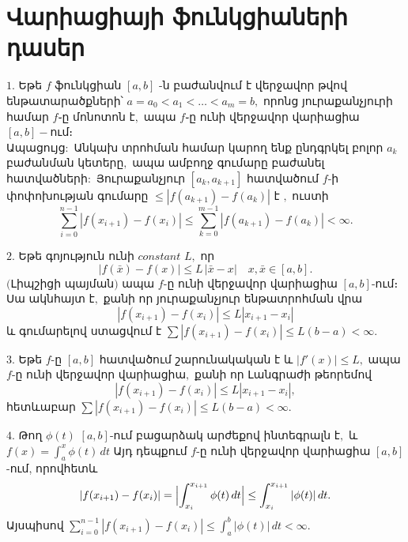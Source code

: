 \documentclass[12pt]{article}
\begin{document}
\section{Վարիացիայի ֆունկցիաների դասեր}
\begin{description}
\item\(1.\) Եթե \(f\) ֆունկցիան  \([a,b]\) -ն բաժանվում է վերջավոր թվով ենթատարածքների՝ \(a=a_0<a_1<\dots<a_m=b\)\(,\) որոնց յուրաքանչյուրի համար \(f֊\)ը մոնոտոն է\(,\) ապա \(f֊\)ը ունի վերջավոր վարիացիա \([a,b]-\)ում։ \\
Ապացույց\(:\) Անկախ տրոհման համար կարող ենք ընդգրկել բոլոր \(a_k\) բաժանման կետերը\(,\) ապա ամբողջ գումարը բաժանել հատվածների\(:\) Յուրաքանչյուր \([a_k,a_{k+1}]\) հատվածում \(f\)-ի փոփոխության գումարը \(\le |f(a_{k+1})-f(a_k)|\) է \(,\) ուստի
\[
\sum_{i=0}^{n-1}|f(x_{i+1})-f(x_i)| \le \sum_{k=0}^{m-1}|f(a_{k+1})-f(a_k)|<\infty.
\]
\item\(2.\) Եթե գոյություն ունի \(constant\) \(L,\) որ
\[
\bigl|f(\bar{x}) - f(x)\bigr| \leq L\, |\bar{x} - x| \quad  x, \bar{x} \in [a, b].
\]
\((\)Լիպշիցի պայման\()\) ապա \(f\)-ը ունի վերջավոր վարիացիա \([a,b]\)-ում։
Սա ակնհայտ է\(,\) քանի որ յուրաքանչյուր ենթատրոհման վրա
\[
|f(x_{i+1})-f(x_i)| \le L|x_{i+1}-x_i|
\]
և գումարելով ստացվում է \(\sum |f(x_{i+1})-f(x_i)| \le L(b-a)<\infty\)\(.\)
\item\(3.\) Եթե \(f\)-ը \([a,b]\) հատվածում շարունակական է և \(|f'(x)| \le L\)\(,\) ապա \(f\)-ը ունի վերջավոր վարիացիա\(,\) քանի որ Լանգրաժի թեորեմով
\[
|f(x_{i+1})-f(x_i)| \le L|x_{i+1}-x_i|,
\]
հետևաբար \(\sum |f(x_{i+1})-f(x_i)| \le L(b-a)<\infty\)\(.\)
\item\(4.\) Թող \(\phi(t)\) \([a,b]\)-ում բացարձակ արժեքով ինտեգրալն է\(,\) և \(f(x) = \int_a^x \phi(t)\,dt\) Այդ դեպքում \(f\)-ը ունի վերջավոր վարիացիա \([a,b]\)-ում, որովհետև
\[
|f(x_{i+1})-f(x_i)| = \Bigl|\int_{x_i}^{x_{i+1}}\phi(t)\,dt\Bigr| \le \int_{x_i}^{x_{i+1}}|\phi(t)|\,dt.
\]
Այսպիսով
\(\sum_{i=0}^{n-1}|f(x_{i+1})-f(x_i)| \le \int_a^b|\phi(t)|\,dt<\infty\).
\end{description}
\end{document}
